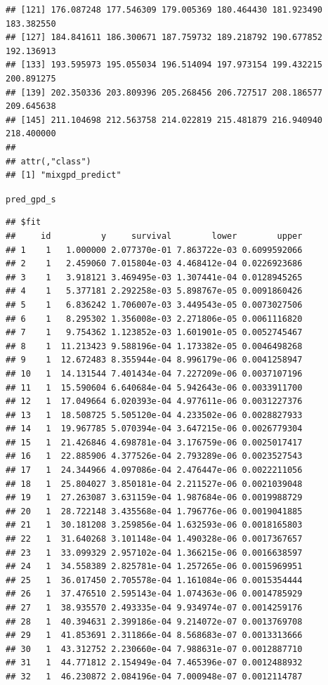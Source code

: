 \documentclass[article]{jss}\usepackage[]{graphicx}\usepackage[]{xcolor}
\makeatletter
\newcommand{\hldef}[1]{\textcolor[rgb]{0.345,0.345,0.345}{#1}}%
\newenvironment{kframe}{%
 \def\at@end@of@kframe{}%
 \ifinner\ifhmode%
  \def\at@end@of@kframe{\end{minipage}}%
  \begin{minipage}{\columnwidth}%
 \fi\fi%
 \def\FrameCommand##1{\hskip\@totalleftmargin \hskip-\fboxsep
 \colorbox{shadecolor}{##1}\hskip-\fboxsep
     \hskip-\linewidth \hskip-\@totalleftmargin \hskip\columnwidth}%
 \MakeFramed {\advance\hsize-\width
   \@totalleftmargin\z@ \linewidth\hsize
   \@setminipage}}%
 {\par\unskip\endMakeFramed%
 \at@end@of@kframe}
\newenvironment{knitrout}{}{} %
\makeatother
\begin{document}
\begin{knitrout}
\begin{kframe}
\begin{verbatim}
## [121] 176.087248 177.546309 179.005369 180.464430 181.923490 183.382550
## [127] 184.841611 186.300671 187.759732 189.218792 190.677852 192.136913
## [133] 193.595973 195.055034 196.514094 197.973154 199.432215 200.891275
## [139] 202.350336 203.809396 205.268456 206.727517 208.186577 209.645638
## [145] 211.104698 212.563758 214.022819 215.481879 216.940940 218.400000
## 
## attr(,"class")
## [1] "mixgpd_predict"
\end{verbatim}
\begin{alltt}
\hldef{pred_gpd_s}
\end{alltt}
\begin{verbatim}
## $fit
##     id          y     survival        lower        upper
## 1    1   1.000000 2.077370e-01 7.863722e-03 0.6099592066
## 2    1   2.459060 7.015804e-03 4.468412e-04 0.0226923686
## 3    1   3.918121 3.469495e-03 1.307441e-04 0.0128945265
## 4    1   5.377181 2.292258e-03 5.898767e-05 0.0091860426
## 5    1   6.836242 1.706007e-03 3.449543e-05 0.0073027506
## 6    1   8.295302 1.356008e-03 2.271806e-05 0.0061116820
## 7    1   9.754362 1.123852e-03 1.601901e-05 0.0052745467
## 8    1  11.213423 9.588196e-04 1.173382e-05 0.0046498268
## 9    1  12.672483 8.355944e-04 8.996179e-06 0.0041258947
## 10   1  14.131544 7.401434e-04 7.227209e-06 0.0037107196
## 11   1  15.590604 6.640684e-04 5.942643e-06 0.0033911700
## 12   1  17.049664 6.020393e-04 4.977611e-06 0.0031227376
## 13   1  18.508725 5.505120e-04 4.233502e-06 0.0028827933
## 14   1  19.967785 5.070394e-04 3.647215e-06 0.0026779304
## 15   1  21.426846 4.698781e-04 3.176759e-06 0.0025017417
## 16   1  22.885906 4.377526e-04 2.793289e-06 0.0023527543
## 17   1  24.344966 4.097086e-04 2.476447e-06 0.0022211056
## 18   1  25.804027 3.850181e-04 2.211527e-06 0.0021039048
## 19   1  27.263087 3.631159e-04 1.987684e-06 0.0019988729
## 20   1  28.722148 3.435568e-04 1.796776e-06 0.0019041885
## 21   1  30.181208 3.259856e-04 1.632593e-06 0.0018165803
## 22   1  31.640268 3.101148e-04 1.490328e-06 0.0017367657
## 23   1  33.099329 2.957102e-04 1.366215e-06 0.0016638597
## 24   1  34.558389 2.825781e-04 1.257265e-06 0.0015969951
## 25   1  36.017450 2.705578e-04 1.161084e-06 0.0015354444
## 26   1  37.476510 2.595143e-04 1.074363e-06 0.0014785929
## 27   1  38.935570 2.493335e-04 9.934974e-07 0.0014259176
## 28   1  40.394631 2.399186e-04 9.214072e-07 0.0013769708
## 29   1  41.853691 2.311866e-04 8.568683e-07 0.0013313666
## 30   1  43.312752 2.230660e-04 7.988631e-07 0.0012887710
## 31   1  44.771812 2.154949e-04 7.465396e-07 0.0012488932
## 32   1  46.230872 2.084196e-04 7.000948e-07 0.0012114787

\end{verbatim}
\end{kframe}
\end{knitrout}
\end{document}
